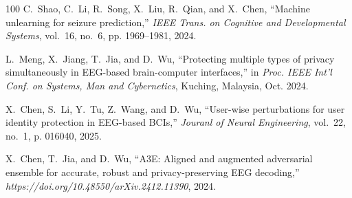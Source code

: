 \documentclass[journal]{IEEEtran}
\begin{document}
\begin{thebibliography}{100}
C.~Shao, C.~Li, R.~Song, X.~Liu, R.~Qian, and X.~Chen, ``Machine unlearning for
  seizure prediction,'' \emph{IEEE Trans. on Cognitive and Developmental
  Systems}, vol.~16, no.~6, pp. 1969--1981, 2024.

L.~Meng, X.~Jiang, T.~Jia, and D.~Wu, ``Protecting multiple types of privacy
  simultaneously in {EEG}-based brain-computer interfaces,'' in \emph{Proc.
  {IEEE} Int'l Conf. on Systems, Man and Cybernetics}, Kuching, Malaysia, Oct.
  2024.

X.~Chen, S.~Li, Y.~Tu, Z.~Wang, and D.~Wu, ``User-wise perturbations for user
  identity protection in {EEG}-based {BCIs},'' \emph{Jouranl of Neural
  Engineering}, vol.~22, no.~1, p. 016040, 2025.

X.~Chen, T.~Jia, and D.~Wu, ``{A3E}: Aligned and augmented adversarial ensemble
  for accurate, robust and privacy-preserving {EEG} decoding,''
  \emph{https://doi.org/10.48550/arXiv.2412.11390}, 2024.

\end{thebibliography}
\end{document}
